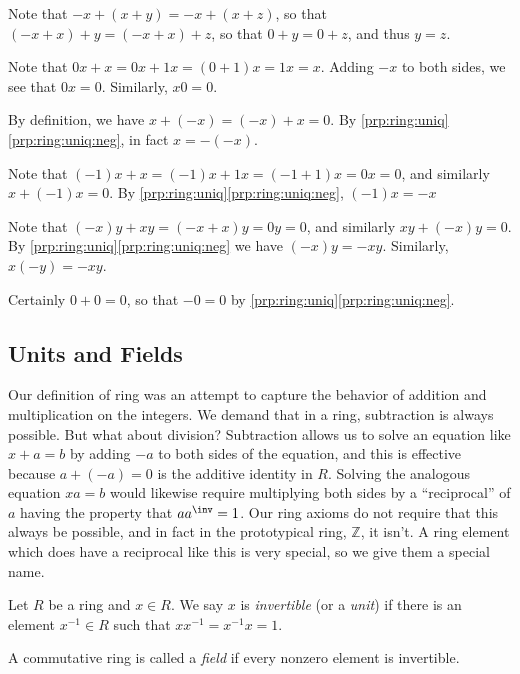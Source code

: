 \begin{theproof}
\begin{inparaenum}
\item Note that $-x + (x+y) = -x + (x+z)$, so that $(-x+x) + y = (-x+x) + z$, so that $0+y = 0+z$, and thus $y = z$.
\item Note that $0x + x = 0x + 1x = (0+1)x = 1x = x$. Adding $-x$ to both sides, we see that $0x = 0$. Similarly, $x0 = 0$.
\item By definition, we have $x + (-x) = (-x) + x = 0$. By \ref{prp:ring:uniq}\ref{prp:ring:uniq:neg}, in fact $x = -(-x)$.
\item Note that $(-1)x + x = (-1)x + 1x = (-1+1)x = 0x = 0$, and similarly $x + (-1)x = 0$. By \ref{prp:ring:uniq}\ref{prp:ring:uniq:neg}, $(-1)x = -x$
\item Note that $(-x)y + xy = (-x+x)y = 0y = 0$, and similarly $xy + (-x)y = 0$. By \ref{prp:ring:uniq}\ref{prp:ring:uniq:neg} we have $(-x)y = -xy$. Similarly, $x(-y) = -xy$.
\item Certainly $0+0 = 0$, so that $-0 = 0$ by \ref{prp:ring:uniq}\ref{prp:ring:uniq:neg}.
\end{inparaenum}
\end{theproof}

\subsection*{Units and Fields}

Our definition of ring was an attempt to capture the behavior of addition and multiplication on the integers. We demand that in a ring, subtraction is always possible. But what about division? Subtraction allows us to solve an equation like $x+a = b$ by adding $-a$ to both sides of the equation, and this is effective because $a + (-a) = 0$ is the additive identity in $R$. Solving the analogous equation $xa = b$ would likewise require multiplying both sides by a ``reciprocal'' of $a$ having the property that $aa^\inv = 1$. Our ring axioms do not require that this always be possible, and in fact in the prototypical ring, $\mathbb{Z}$, it isn't. A ring element which does have a reciprocal like this is very special, so we give them a special name.

\begin{dfn} \mbox{}
\begin{enumerate*}
\item Let $R$ be a ring and $x \in R$. We say $x$ is \emph{invertible} (or a \emph{unit}) if there is an element $x^{-1} \in R$ such that $xx^{-1} = x^{-1}x = 1$.
\item A commutative ring is called a \emph{field} if every nonzero element is invertible.
\end{enumerate*}
\end{dfn}

